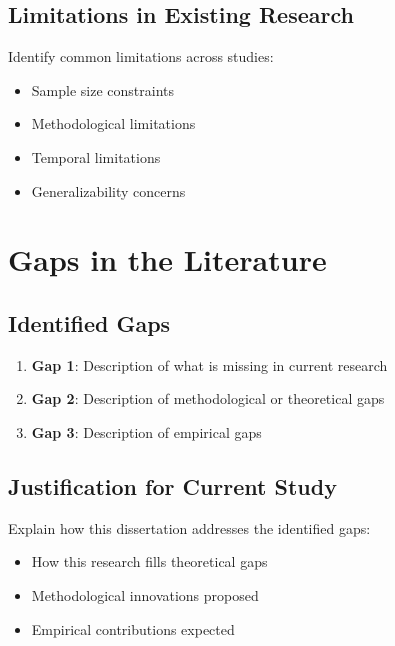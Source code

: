 \documentclass[
  12pt,
  letterpaper,
  12pt,
  letterpaper,
  oneside]{report}
\providecommand{\tightlist}{%
  \setlength{\itemsep}{0pt}\setlength{\parskip}{0pt}}
\begin{document}
\subsection{Limitations in Existing
Research}\label{limitations-in-existing-research}

Identify common limitations across studies:

\begin{itemize}
\tightlist
\item
  Sample size constraints
\item
  Methodological limitations
\item
  Temporal limitations
\item
  Generalizability concerns
\end{itemize}

\section{Gaps in the Literature}\label{gaps-in-the-literature}

\subsection{Identified Gaps}\label{identified-gaps}

\begin{enumerate}
\def\labelenumi{\arabic{enumi}.}
\tightlist
\item
  \textbf{Gap 1}: Description of what is missing in current research
\item
  \textbf{Gap 2}: Description of methodological or theoretical gaps
\item
  \textbf{Gap 3}: Description of empirical gaps
\end{enumerate}

\subsection{Justification for Current
Study}\label{justification-for-current-study}

Explain how this dissertation addresses the identified gaps:

\begin{itemize}
\tightlist
\item
  How this research fills theoretical gaps
\item
  Methodological innovations proposed
\item
  Empirical contributions expected
\end{itemize}
\end{document}
